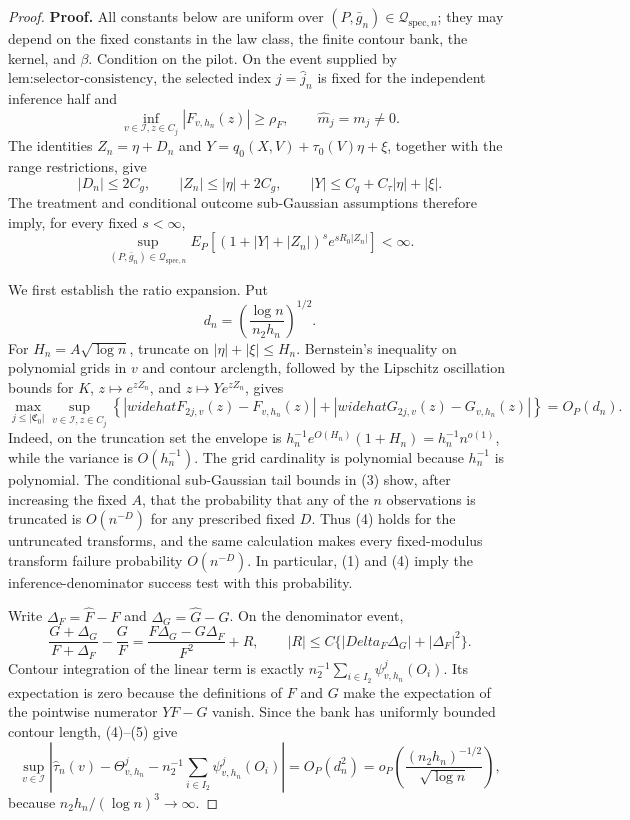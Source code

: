 \documentclass{article}
\begin{document}
\begin{proof}
\textbf{Proof.}
All constants below are uniform over \((P,\bar g_n)\in\mathcal Q_{\mathrm{spec},n}\); they may depend on the fixed constants in the law class, the finite contour bank, the kernel, and \(\beta\).  Condition on the pilot.  On the event supplied by \(\text{lem:selector-consistency}\), the selected index \(j=\widehat j_n\) is fixed for the independent inference half and
\[
 \inf_{v\in\mathcal I,z\in C_j}|F_{v,h_n}(z)|\ge\rho_F,
 \qquad \widehat m_j=m_j\ne0. \tag{1}
\]
The identities \(Z_n=\eta+D_n\) and \(Y=q_0(X,V)+\tau_0(V)\eta+\xi\), together with the range restrictions, give
\[
 |D_n|\le2C_g,
 \qquad |Z_n|\le|\eta|+2C_g,
 \qquad |Y|\le C_q+C_\tau|\eta|+|\xi|. \tag{2}
\]
The treatment and conditional outcome sub-Gaussian assumptions therefore imply, for every fixed \(s<\infty\),
\[
 \sup_{(P,\bar g_n)\in\mathcal Q_{\mathrm{spec},n}}
 E_P\!\left[(1+|Y|+|Z_n|)^s e^{sR_0|Z_n|}\right]<\infty. \tag{3}
\]

We first establish the ratio expansion.  Put
\[
 d_n=\left(\frac{\log n}{n_2h_n}\right)^{1/2}.
\]
For \(H_n=A\sqrt{\log n}\), truncate on \(|\eta|+|\xi|\le H_n\).  Bernstein's inequality on polynomial grids in \(v\) and contour arclength, followed by the Lipschitz oscillation bounds for \(K\), \(z\mapsto e^{zZ_n}\), and \(z\mapsto Ye^{zZ_n}\), gives
\[
 \max_{j\le|\mathfrak C_0|}\sup_{v\in\mathcal I,z\in C_j}
 \left\{|widehat F_{2j,v}(z)-F_{v,h_n}(z)|
 +|widehat G_{2j,v}(z)-G_{v,h_n}(z)|\right\}=O_P(d_n). \tag{4}
\]
Indeed, on the truncation set the envelope is
\(h_n^{-1}e^{O(H_n)}(1+H_n)=h_n^{-1}n^{o(1)}\), while the variance is \(O(h_n^{-1})\).  The grid cardinality is polynomial because \(h_n^{-1}\) is polynomial.  The conditional sub-Gaussian tail bounds in (3) show, after increasing the fixed \(A\), that the probability that any of the \(n\) observations is truncated is \(O(n^{-D})\) for any prescribed fixed \(D\).  Thus (4) holds for the untruncated transforms, and the same calculation makes every fixed-modulus transform failure probability \(O(n^{-D})\).  In particular, (1) and (4) imply the inference-denominator success test with this probability.

Write \(\Delta_F=\widehat F-F\) and \(\Delta_G=\widehat G-G\).  On the denominator event,
\[
 \frac{G+\Delta_G}{F+\Delta_F}-\frac GF
 =\frac{F\Delta_G-G\Delta_F}{F^2}+R,
 \qquad |R|\le C\{|Delta_F\Delta_G|+|\Delta_F|^2\}. \tag{5}
\]
Contour integration of the linear term is exactly
\(n_2^{-1}\sum_{i\in I_2}\psi^j_{v,h_n}(O_i)\).  Its expectation is zero because the definitions of \(F\) and \(G\) make the expectation of the pointwise numerator \(YF-G\) vanish.  Since the bank has uniformly bounded contour length, (4)--(5) give
\[
 \sup_{v\in\mathcal I}\left|
 \widehat\tau_n(v)-\Theta^j_{v,h_n}
 -n_2^{-1}\sum_{i\in I_2}\psi^j_{v,h_n}(O_i)
 \right|
 =O_P(d_n^2)
 =o_P\!\left(\frac{(n_2h_n)^{-1/2}}{\sqrt{\log n}}\right), \tag{6}
\]
because \(n_2h_n/(\log n)^3\to\infty\).


\end{proof}
\end{document}
